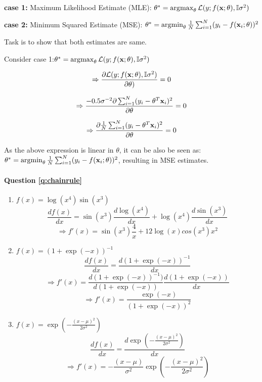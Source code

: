\textbf{case 1:} Maximum Likelihood Estimate (MLE): 
$\theta^* = \operatorname*{\arg\!\max}_{\theta} \mathcal{L}(y; f(\mathbf{x}; \theta), \mathbb{I}\sigma^2)$

\textbf{case 2:} Minimum Squared Estimate (MSE):
$\theta^* = \operatorname*{\arg\!\min}_{\theta} \frac{1}{N}\sum_{i=1}^N(y_i - f(\mathbf{x}_i; \theta))^2$

Task is to show that both estimates are same.



Consider case 1:$\theta^* = \operatorname*{\arg\!\max}_{\theta} \mathcal{L}(y; f(\mathbf{x}; \theta), \mathbb{I}\sigma^2)$

$$ \Rightarrow \frac{\partial \mathcal{L}(y; f(\mathbf{x}; \theta), \mathbb{I}\sigma^2)}{\partial \theta)} = 0 $$


$$ \Rightarrow \frac{-0.5\sigma^{-2}\partial \sum_{i=1}^N (y_i - \theta^T\mathbf{x}_i)^2}{\partial \theta} = 0 $$

$$ \Rightarrow \frac{\partial \frac{1}{N}\sum_{i=1}^N (y_i - \theta^T\mathbf{x}_i)^2}{\partial \theta} = 0 $$

As the above expression is linear in $\theta$, it can be also be seen as: $\theta^* = \operatorname*{\arg\!\min}_{\theta} \frac{1}{N}\sum_{i=1}^N(y_i - f(\mathbf{x}_i; \theta))^2$, resulting in MSE estimates.




\paragraph{Question \ref{q:chainrule}}
\begin{enumerate}[label=\alph*.]
\item $f(x) = \log (x^4) \sin (x^3)$
        $$\frac{d f(x)}{dx} = \sin(x^3) \frac{d \log(x^4)}{dx} + \log (x^4)\frac{d \sin(x^3)}{dx}$$
        $$\Rightarrow f'(x) = \sin(x^3)\frac{4}{x} + 12\log(x)cos(x^3)x^2$$
        
\item $f(x) = (1 + \exp(-x))^{-1}$
         $$\frac{d f(x)}{dx} = \frac{d (1 + \exp(-x))^{-1}}{dx}$$
         $$\Rightarrow f'(x) = \frac{d (1 + \exp(-x))^{-1})}{d(1 + \exp(-x))} \frac{d(1 + \exp(-x))}{dx}$$
         $$\Rightarrow f'(x) = \frac{\exp(-x)}{(1 + \exp(-x))^2}$$
        
\item $f(x) = \exp\left(-\frac{(x-\mu)^2}{2\sigma^2}\right)$
         $$\frac{d f(x)}{dx} = \frac{d \exp\left(-\frac{(x-\mu)^2}{2\sigma^2}\right)}{dx}$$
         $$\Rightarrow f'(x) = -\frac{(x-\mu)}{\sigma^2}\exp\left(-\frac{(x-\mu)^2}{2\sigma^2}\right)$$

\end{enumerate}
